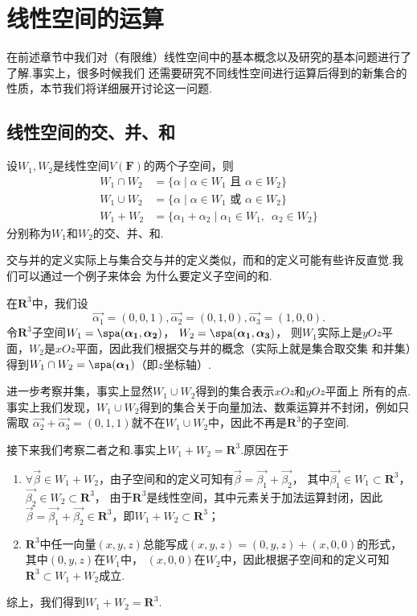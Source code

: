 \chapter{线性空间的运算}

在前述章节中我们对（有限维）线性空间中的基本概念以及研究的基本问题进行了了解.事实上，很多时候我们
还需要研究不同线性空间进行运算后得到的新集合的性质，本节我们将详细展开讨论这一问题.

\section{线性空间的交、并、和}
\begin{definition}
    设$W_1,W_2$是线性空间$V(\mathbf{F})$的两个子空间，则
    \begin{align*}
    W_1 \cap W_2&=\{\alpha \mid \alpha\in W_1 \text{ 且 } \alpha\in W_2\} \\
    W_1 \cup W_2&=\{\alpha \mid \alpha\in W_1 \text{ 或 } \alpha\in W_2\} \\
    W_1 + W_2&=\{\alpha_1+\alpha_2 \mid \alpha_1\in W_1,\enspace\alpha_2\in W_2\}
    \end{align*}
    分别称为$W_1$和$W_2$的交、并、和.
\end{definition}

交与并的定义实际上与集合交与并的定义类似，而和的定义可能有些许反直觉.我们可以通过一个例子来体会
为什么要定义子空间的和.
\begin{example}\label{ex:4:子空间运算}
    在$\mathbf{R}^3$中，我们设
    \[\vec{\alpha_1}=(0,0,1),\vec{\alpha_2}=(0,1,0),\vec{\alpha_3}=(1,0,0).\]
    令$\mathbf{R}^3$子空间$W_1=\spa(\vec{\alpha_1},\vec{\alpha_2})$，
    $W_2=\spa(\vec{\alpha_1},\vec{\alpha_3})$，
    则$W_1$实际上是$yOz$平面，$W_2$是$xOz$平面，因此我们根据交与并的概念（实际上就是集合取交集
    和并集）得到$W_1 \cap W_2=\spa(\vec{\alpha_1})$（即$z$坐标轴）.
    
    进一步考察并集，事实上显然$W_1 \cup W_2$得到的集合表示$xOz$和$yOz$平面上
    所有的点.事实上我们发现，$W_1 \cup W_2$得到的集合关于向量加法、数乘运算并不封闭，例如只需取
    $\vec{\alpha_2}+\vec{\alpha_3}=(0,1,1)$就不在$W_1 \cup W_2$中，因此不再是$\mathbf{R}^3$的子空间.
    
    接下来我们考察二者之和.事实上$W_1+W_2=\mathbf{R}^3$.原因在于
    \begin{enumerate}
        \item $\forall \vec{\beta}\in W_1 + W_2$，由子空间和的定义可知有$\vec{\beta}=\vec{\beta_1}+\vec{\beta_2}$，
        其中$\vec{\beta_1}\in W_1\subset \mathbf{R}^3$，$\vec{\beta_2}\in W_2\subset \mathbf{R}^3$，
        由于$\mathbf{R}^3$是线性空间，其中元素关于加法运算封闭，因此
        $\vec{\beta}=\vec{\beta_1}+\vec{\beta_2}\in \mathbf{R}^3$，即$W_1+W_2\subset \mathbf{R}^3$；

        \item $\mathbf{R}^3$中任一向量$(x,y,z)$总能写成$(x,y,z)=(0,y,z)+(x,0,0)$的形式，其中$(0,y,z)$在$W_1$中，
        $(x,0,0)$在$W_2$中，因此根据子空间和的定义可知$\mathbf{R}^3\subset W_1 + W_2$成立.
    \end{enumerate}
    综上，我们得到$W_1+W_2=\mathbf{R}^3$.
\end{example}

